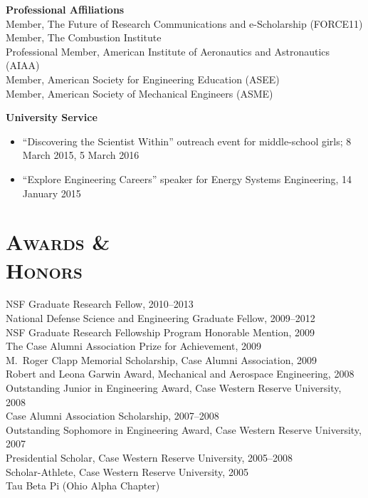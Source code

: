\documentclass[margin,line,11pt]{res}
\begin{document}
\begin{resume}
\textbf{Professional Affiliations} \\
Member, The Future of Research Communications and e-Scholarship (FORCE11) \\
Member, The Combustion Institute \\
Professional Member, American Institute of Aeronautics and Astronautics (AIAA) \\
Member, American Society for Engineering Education (ASEE) \\
Member, American Society of Mechanical Engineers (ASME)

\textbf{University Service}
\begin{itemize}[leftmargin=*]
\item ``Discovering the Scientist Within'' outreach event for middle-school girls; 8 March 2015, 5 March 2016
\item ``Explore Engineering Careers'' speaker for Energy Systems Engineering, 14 January 2015
\end{itemize}

\section{\textsc{Awards \& \\Honors}}
NSF Graduate Research Fellow, 2010--2013 \\
National Defense Science and Engineering Graduate Fellow, 2009--2012 \\
NSF Graduate Research Fellowship Program Honorable Mention, 2009 \\
The Case Alumni Association Prize for Achievement, 2009 \\
M.\ Roger Clapp Memorial Scholarship, Case Alumni Association, 2009 \\
Robert and Leona Garwin Award, Mechanical and Aerospace Engineering, 2008 \\
Outstanding Junior in Engineering Award, Case Western Reserve University, 2008 \\
Case Alumni Association Scholarship, 2007--2008 \\
Outstanding Sophomore in Engineering Award, Case Western Reserve University, 2007 \\
Presidential Scholar, Case Western Reserve University, 2005--2008 \\
Scholar-Athlete, Case Western Reserve University, 2005 \\
Tau Beta Pi (Ohio Alpha Chapter)


\end{resume}
\end{document}
